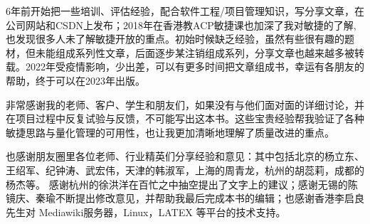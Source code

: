 \documentclass[]{article}
\date{}
\begin{document}
6年前开始把一些培训、评估经验，配合软件工程/项目管理知识，写分享文章，在公司网站和CSDN上发布；2018年在香港教ACP敏捷课也加深了我对敏捷的了解,也发现很多人未了解敏捷开放的重点。初始时候缺乏经验，虽然有些很有趣的题材，但未能组成系列性文章，后面逐步某注销组成系列，分享文章也越来越多被转载。2022年受疫情影响，少出差，可以有更多时间把文章组成书，幸运有各朋友的帮助，终于可以在2023年出版。

非常感谢我的老师、客户、学生和朋友们，如果没有与他们面对面的详细讨论，并在项目过程中反复试验与反馈，不可能写出这本书。这些宝贵经验帮我验证了各种敏捷思路与量化管理的可用性，也让我更加清晰地理解了质量改进的重点。

也感谢朋友圈里各位老师、行业精英们分享经验和意见：其中包括北京的杨立东、王绍军、纪钟涛、武宏伟，天津的韩淑军，上海的周青龙，杭州的胡蕊莉，成都的杨杰等。
感谢杭州的徐洪洋在百忙之中抽空提出了文字上的建议；感谢无锡的陈镜庆、秦瑜不断提出修改意见，并帮助我最后完成本书的编辑；也感谢香港李启良先生对
Mediawiki服务器，Linux，LATEX 等平台的技术支持。
\end{document}
